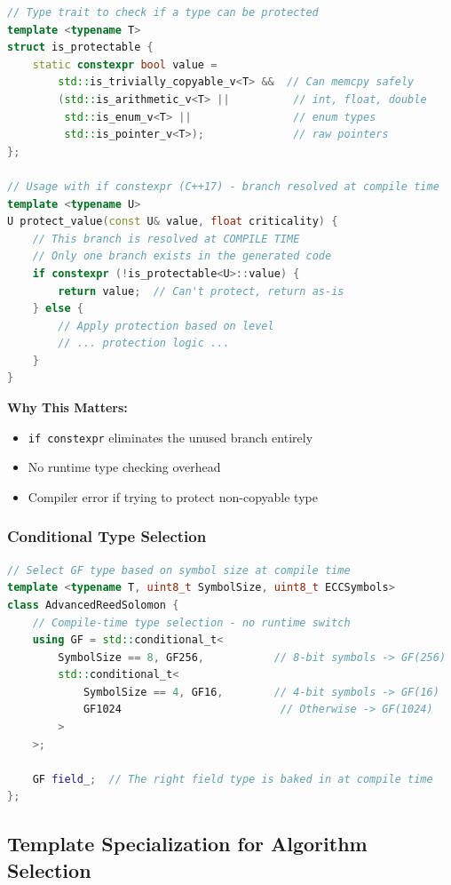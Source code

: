 \documentclass[11pt,a4paper]{article}
\begin{document}
\begin{lstlisting}[language=C++, basicstyle=\small\ttfamily]
// Type trait to check if a type can be protected
template <typename T>
struct is_protectable {
    static constexpr bool value =
        std::is_trivially_copyable_v<T> &&  // Can memcpy safely
        (std::is_arithmetic_v<T> ||          // int, float, double
         std::is_enum_v<T> ||                // enum types
         std::is_pointer_v<T>);              // raw pointers
};

// Usage with if constexpr (C++17) - branch resolved at compile time
template <typename U>
U protect_value(const U& value, float criticality) {
    // This branch is resolved at COMPILE TIME
    // Only one branch exists in the generated code
    if constexpr (!is_protectable<U>::value) {
        return value;  // Can't protect, return as-is
    } else {
        // Apply protection based on level
        // ... protection logic ...
    }
}
\end{lstlisting}

\textbf{Why This Matters:}
\begin{itemize}
    \item \texttt{if constexpr} eliminates the unused branch entirely
    \item No runtime type checking overhead
    \item Compiler error if trying to protect non-copyable type
\end{itemize}

\subsubsection{Conditional Type Selection}

\begin{lstlisting}[language=C++, basicstyle=\small\ttfamily]
// Select GF type based on symbol size at compile time
template <typename T, uint8_t SymbolSize, uint8_t ECCSymbols>
class AdvancedReedSolomon {
    // Compile-time type selection - no runtime switch
    using GF = std::conditional_t<
        SymbolSize == 8, GF256,           // 8-bit symbols -> GF(256)
        std::conditional_t<
            SymbolSize == 4, GF16,        // 4-bit symbols -> GF(16)
            GF1024                         // Otherwise -> GF(1024)
        >
    >;

    GF field_;  // The right field type is baked in at compile time
};
\end{lstlisting}

\subsection{Template Specialization for Algorithm Selection}
\end{document}
